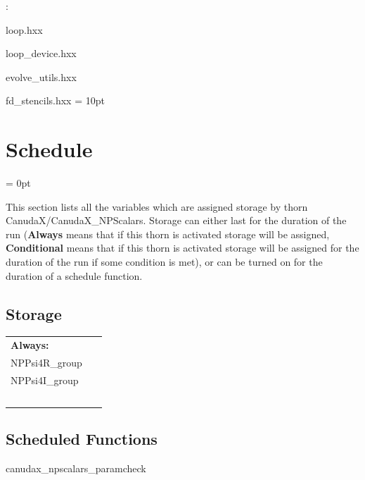 \vspace{5mm}

: 

loop.hxx

loop\_device.hxx

evolve\_utils.hxx

fd\_stencils.hxx
\vspace{2mm}\parskip = 10pt 

\section{Schedule} 


\parskip = 0pt


\noindent This section lists all the variables which are assigned storage by thorn CanudaX/CanudaX\_NPScalars.  Storage can either last for the duration of the run ({\bf Always} means that if this thorn is activated storage will be assigned, {\bf Conditional} means that if this thorn is activated storage will be assigned for the duration of the run if some condition is met), or can be turned on for the duration of a schedule function.


\subsection*{Storage}

\hspace{5mm}

 \begin{tabular*}{160mm}{ll} 

{\bf Always:}&  ~ \\ 
 NPPsi4R\_group & ~\\ 
 NPPsi4I\_group & ~\\ 
~ & ~\\ 
\end{tabular*} 


\subsection*{Scheduled Functions}
\vspace{5mm}


\hspace{5mm} canudax\_npscalars\_paramcheck 

\hspace{5mm}{\it check canudax\_npscalars parameters for consistency } 



